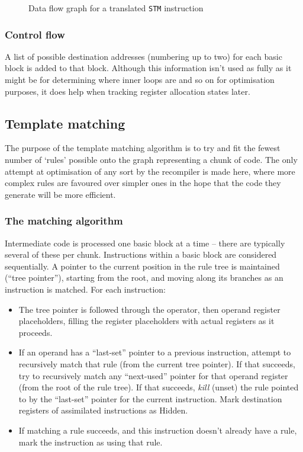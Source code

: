 \begin{figure}[tbh]

\centerline{}

\caption{\label{stmgraph}Data flow graph for a translated {\tt STM} instruction}
\end{figure}

\subsubsection{Control flow}

A list of possible destination addresses (numbering up to two) for each basic block is added to that block. Although this information isn't used as fully as it might be for determining where inner loops are and so on for optimisation purposes, it does help when tracking register allocation states later.

\subsection{Template matching}

The purpose of the template matching algorithm is to try and fit the fewest number of `rules' possible onto the graph representing a chunk of code. The only attempt at optimisation of any sort by the recompiler is made here, where more complex rules are favoured over simpler ones in the hope that the code they generate will be more efficient.

\subsubsection{The matching algorithm}

Intermediate code is processed one basic block at a time -- there are typically several of these per chunk. Instructions within a basic block are considered sequentially. A pointer to the current position in the rule tree is maintained (``tree pointer''), starting from the root, and moving along its branches as an instruction is matched. For each instruction:

\begin{itemize}

\item The tree pointer is followed through the operator, then operand register placeholders, filling the register placeholders with actual registers as it proceeds.
\item If an operand has a ``last-set'' pointer to a previous instruction, attempt to recursively match that rule (from the current tree pointer). If that succeeds, try to recursively match any ``next-used'' pointer for that operand register (from the root of the rule tree). If that succeeds, {\it kill} (unset) the rule pointed to by the ``last-set'' pointer for the current instruction. Mark destination registers of assimilated instructions as {\sc Hidden}.
\item If matching a rule succeeds, and this instruction doesn't already have a rule, mark the instruction as using that rule.

\end{itemize}

